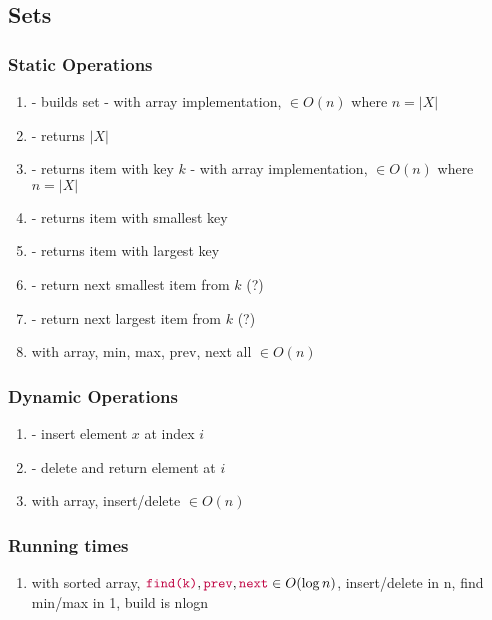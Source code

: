 \documentclass{article}
\begin{document}
    \subsection{Sets}
        \subsubsection{Static Operations}
            \begin{enumerate}
                \item {} - builds set
                    \subitem - with array implementation,  $\in O(n)$ where $n = |X|$
                \item {} - returns $|X|$
                \item {} - returns item with key $k$
                    \subitem - with array implementation,  $\in O(n)$ where $n = |X|$
                \item {} - returns item with smallest key
                \item {} - returns item with largest key
                \item {} - return next smallest item from $k$ (?)
                \item {} - return next largest item from $k$ (?)
                \item with array, min, max, prev, next all $\in O(n)$
    
            \end{enumerate}
        \subsubsection{Dynamic Operations}
            \begin{enumerate}
                \item {} - insert element $x$ at index $i$
                \item {} - delete and return element at $i$
                \item with array, insert/delete $\in O(n)$
            \end{enumerate}
        \subsubsection{Running times}
            \begin{enumerate}
                \item with sorted array, $\texttt{\textcolor{purple}{find(k)}}, \texttt{\textcolor{purple}{prev}}, \texttt{\textcolor{purple}{next}} \in O(\log n)$, insert/delete in n, find min/max in 1, build is nlogn
            \end{enumerate}
\end{document}
